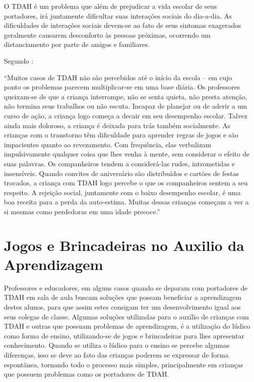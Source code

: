 \documentclass[
	12pt,				%
    oneside,			%
	a4paper,			%
	english,			%
	french,				%
	spanish,			%
	brazil,				%
	]{abntex2}
\begin{document}
	O TDAH é um problema que além de prejudicar a vida escolar de seus portadores, irá juntamente dificultar suas interações sociais do dia-a-dia. As dificuldades de interações sociais devem-se ao fato de seus sintomas exagerados geralmente causarem desconforto às pessoas próximas, ocorrendo um distanciamento por parte de amigos e familiares.
	
	Segundo  :
	\begin{citacao}
		“Muitos casos de TDAH não são percebidos até o início da escola – em cujo ponto os problemas parecem multiplicar-se em uma base diária. Os professores queixam-se de que a criança interrompe, não se senta quieta, não presta atenção, não termina seus trabalhos ou não escuta. Incapaz de planejar ou de aderir a um curso de ação, a criança logo começa a decair em seu desempenho escolar. Talvez ainda mais doloroso, a criança é deixada para trás também socialmente. As crianças com o transtorno têm dificuldade para aprender regras de jogos e são impacientes quanto ao revezamento. Com frequência, elas verbalizam impulsivamente qualquer coisa que lhes venha à mente, sem considerar o efeito de suas palavras. Os companheiros tendem a considerá-las rudes, intrometidas e insensíveis. Quando convites de aniversário são distribuídos e cartões de festas trocados, a criança com TDAH logo percebe o que os companheiros sentem a seu respeito. A rejeição social, juntamente com o baixo desempenho escolar, é uma boa receita para a perda da auto-estima. Muitas dessas crianças começam a ver a si mesmas como perdedoras em uma idade precoce.''
	\end{citacao}


\section{Jogos e Brincadeiras no Auxilio da Aprendizagem}

	Professores e educadores, em alguns casos quando se deparam com portadores de TDAH em sala de aula buscam soluções que possam beneficiar a aprendizagem destes alunos, para que assim estes consigam ter um desenvolvimento igual aos seus colegas de classe. Algumas soluções utilizadas para o auxílio de crianças com TDAH e outras que possuam problemas de aprendizagem, é a utilização do lúdico como forma de ensino, utilizando-se de jogos e brincadeiras para lhes apresentar conhecimento. Quando se utiliza o lúdico para o ensino se percebe algumas diferenças, isso se deve ao fato das crianças poderem se expressar de forma espontânea, tornando todo o processo mais simples, principalmente em crianças que possuem problemas como os portadores de TDAH.
	
\end{document}
